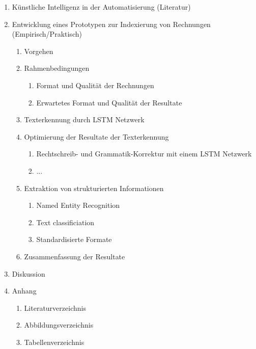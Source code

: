\documentclass{hwz}
\begin{document}
{\begin{enumerate}[topsep=0pt,itemsep=2pt,partopsep=4pt, parsep=4pt]
\begin{enumerate}[topsep=0pt,itemsep=2pt,partopsep=4pt, parsep=4pt]
\begin{enumerate}[topsep=0pt,itemsep=2pt,partopsep=4pt, parsep=4pt]
                \item Text classification
            \end{enumerate}
        \end{enumerate}
        \item Künstliche Intelligenz in der Automatisierung (Literatur)
        \item Entwicklung eines Prototypen zur Indexierung von Rechnungen (Empirisch/Praktisch)
        \begin{enumerate}[topsep=0pt,itemsep=2pt,partopsep=4pt, parsep=4pt]
            \item Vorgehen
            \item Rahmenbedingungen
            \begin{enumerate}[topsep=0pt,itemsep=2pt,partopsep=4pt, parsep=4pt]
                \item Format und Qualität der Rechnungen
                \item Erwartetes Format und Qualität der Resultate
            \end{enumerate}
            \item Texterkennung durch LSTM Netzwerk
            \item Optimierung der Resultate der Texterkennung
            \begin{enumerate}[topsep=0pt,itemsep=2pt,partopsep=4pt, parsep=4pt]
                \item Rechtschreib- und Grammatik-Korrektur mit einem LSTM Netzwerk
                \item ...
            \end{enumerate}
            \item Extraktion von strukturierten Informationen
            \begin{enumerate}[topsep=0pt,itemsep=2pt,partopsep=4pt, parsep=4pt]
                \item Named Entity Recognition
                \item Text classificiation
                \item Standardisierte Formate 
            \end{enumerate}
            \item Zusammenfassung der Resultate
        \end{enumerate}
        \item Diskussion
        \item Anhang
        \begin{enumerate}[topsep=0pt,itemsep=2pt,partopsep=4pt, parsep=4pt]
            \item Literaturverzeichnis
            \item Abbildungsverzeichnis
            \item Tabellenverzeichnis
        \end{enumerate}
    \end{enumerate}
}
\end{document}
